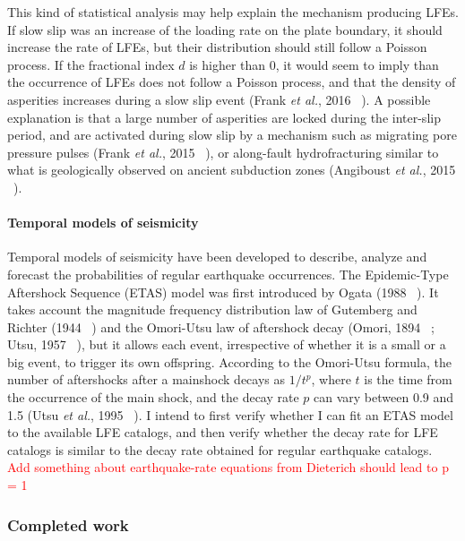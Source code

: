 \documentclass[letterpaper, 12pt]{article}
\begin{document}
This kind of statistical analysis may help explain the mechanism producing LFEs. If slow slip was an increase of the loading rate on the plate boundary, it should increase the rate of LFEs, but their distribution should still follow a Poisson process. If the fractional index $d$ is higher than 0, it would seem to imply than the occurrence of LFEs does not follow a Poisson process, and that the density of asperities increases during a slow slip event (Frank \textit{et al.}, 2016 ~\cite{FRA_2016_SA}). A possible explanation is that a large number of asperities are locked during the inter-slip period, and are activated during slow slip by a mechanism such as migrating pore pressure pulses (Frank \textit{et al.}, 2015 ~\cite{FRA_2015}), or along-fault hydrofracturing similar to what is geologically observed on ancient subduction zones (Angiboust \textit{et al.}, 2015 ~\cite{ANG_2015}).

\paragraph{Temporal models of seismicity} Temporal models of seismicity have been developed to describe, analyze and forecast the probabilities of regular earthquake occurrences. The Epidemic-Type Aftershock Sequence (ETAS) model was first introduced by Ogata (1988 ~\cite{OGA_1988}). It takes account the magnitude frequency distribution law of Gutemberg and Richter (1944 ~\cite{GUT_1944}) and the Omori-Utsu law of aftershock decay (Omori, 1894 ~\cite{OMO_1894}; Utsu, 1957 ~\cite{UTS_1957}), but it allows each event, irrespective of whether it is a small or a big event, to trigger its own offspring. According to the Omori-Utsu formula, the number of aftershocks after a mainshock decays as $1 / t^p$, where $t$ is the time from the occurrence of the main shock, and the decay rate $p$ can vary between 0.9 and 1.5 (Utsu \textit{et al.}, 1995 ~\cite{UTS_1995}). I intend to first verify whether I can fit an ETAS model to the available LFE catalogs, and then verify whether the decay rate for LFE catalogs is similar to the decay rate obtained for regular earthquake catalogs. \\

\textcolor{red}{Add something about earthquake-rate equations from Dieterich should lead to p = 1}

\subsubsection*{Completed work}
\end{document}
